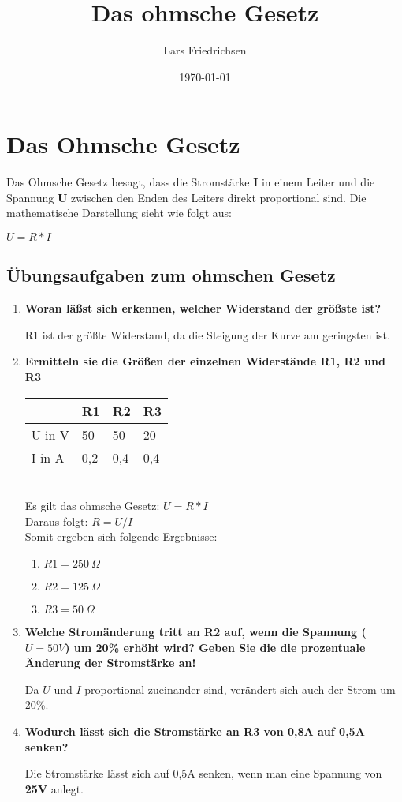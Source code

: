 \documentclass[a4paper,11pt]{scrartcl}	%
\title{Das ohmsche Gesetz}
\author{Lars Friedrichsen}
\date{\today}
\begin{document}
\section{Das Ohmsche Gesetz}
Das Ohmsche Gesetz besagt, dass die Stromstärke \textbf{I} in einem Leiter und die Spannung \textbf{U} zwischen den Enden des Leiters direkt proportional sind. Die mathematische Darstellung sieht wie folgt aus:\par
$U = R * I$

	\subsection{Übungsaufgaben zum ohmschen Gesetz}
		\begin{enumerate}
			\item \textbf{Woran läßst sich erkennen, welcher Widerstand der größste ist?}\par
			R1 ist der größte Widerstand, da die Steigung der Kurve am geringsten ist.
			\item \textbf{Ermitteln sie die Größen der einzelnen Widerstände R1, R2 und R3}\par
				\begin{tabular}{|l|l|l|l|}
					\hline
							&	R1		&	R2	&	R3\\ \hline
					U in V	&	50		&	50	&	20\\ \hline
					I in A	&	0,2		&	0,4	&	0,4\\ \hline
				\end{tabular}\\[0.5cm]
			Es gilt das ohmsche Gesetz: $U = R * I$\\
			Daraus folgt: $R = U / I$\\[0.5cm]
			Somit ergeben sich folgende Ergebnisse:
				\begin{enumerate}
					\item $R1 = 250\ \Omega$
					\item $R2 = 125\ \Omega$
					\item $R3 = 50\ \Omega$				
				\end{enumerate}							
			\item \textbf{Welche Stromänderung tritt an R2 auf, wenn die Spannung ($U = 50V$) um 20\% erhöht wird?
			Geben Sie die die prozentuale Änderung der Stromstärke an!}\par
			Da $U$ und $I$ proportional zueinander sind, verändert sich auch der Strom um 20\%.
			\item \textbf{Wodurch lässt sich die Stromstärke an R3 von 0,8A auf 0,5A senken?}\par
			Die Stromstärke lässt sich auf 0,5A senken, wenn man eine Spannung von \textbf{25V} anlegt.
			
		\end{enumerate}
	
\end{document}
